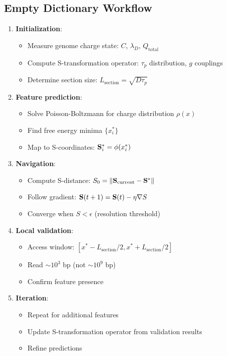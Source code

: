 \subsection{Empty Dictionary Workflow}

\begin{definition}
\label{def:empty_dictionary_algorithm}
\begin{enumerate}
\item \textbf{Initialization}:
   \begin{itemize}
   \item Measure genome charge state: $C$, $\lambda_D$, $Q_{\text{total}}$
   \item Compute S-transformation operator: $\tau_p$ distribution, $g$ couplings
   \item Determine section size: $L_{\text{section}} = \sqrt{D\tau_p}$
   \end{itemize}

\item \textbf{Feature prediction}:
   \begin{itemize}
   \item Solve Poisson-Boltzmann for charge distribution $\rho(x)$
   \item Find free energy minima $\{x_i^*\}$
   \item Map to S-coordinates: $\mathbf{S}_i^* = \phi(x_i^*)$
   \end{itemize}

\item \textbf{Navigation}:
   \begin{itemize}
   \item Compute S-distance: $S_0 = \|\mathbf{S}_{\text{current}} - \mathbf{S}^*\|$
   \item Follow gradient: $\mathbf{S}(t+1) = \mathbf{S}(t) - \eta\nabla S$
   \item Converge when $S < \epsilon$ (resolution threshold)
   \end{itemize}

\item \textbf{Local validation}:
   \begin{itemize}
   \item Access window: $[x^* - L_{\text{section}}/2, x^* + L_{\text{section}}/2]$
   \item Read $\sim 10^3$ bp (not $\sim 10^9$ bp)
   \item Confirm feature presence
   \end{itemize}

\item \textbf{Iteration}:
   \begin{itemize}
   \item Repeat for additional features
   \item Update S-transformation operator from validation results
   \item Refine predictions
   \end{itemize}
\end{enumerate}
\end{definition}

